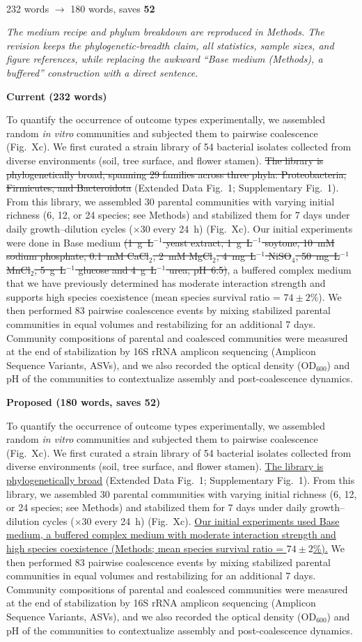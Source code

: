 \documentclass[11pt,a4paper]{article}
\newcommand{\figref}[1]{Fig.~X}
\newcommand{\cutx}[1]{{\color{CutRed}\sout{#1}}}
\newcommand{\newx}[1]{{\color{CutRed}\uline{#1}}}
\newcommand{\itemhead}[5]{\vspace{1.1em}\noindent{\color{HeadBlue}\large\textbf{#1}\quad\normalsize\textbf{#2}}\\[0.2em]
{\color{GrayNote}\small #3 words $\rightarrow$ #4 words, saves \textbf{#5}}\par}
\newcommand{\rationale}[1]{{\color{GrayNote}\small\textit{#1}}\par\smallskip}
\newcommand{\panel}[1]{\par\smallskip\noindent\textbf{\small #1}\par}
\begin{document}
\itemhead{R-2}{Results section 1, paragraph 2 (experimental setup)}{232}{180}{52}

\rationale{The medium recipe and phylum breakdown are reproduced in Methods. The revision keeps the phylogenetic-breadth claim, all statistics, sample sizes, and figure references, while replacing the awkward ``Base medium (Methods), a buffered'' construction with a direct sentence.}
\panel{Current (232 words)}
To quantify the occurrence of outcome types experimentally, we assembled random \textit{in vitro} communities and subjected them to pairwise coalescence (\figref{fig:fig1}c). We first curated a strain library of 54 bacterial isolates collected from diverse environments (soil, tree surface, and flower stamen). \cutx{The library is phylogenetically broad, spanning 29 families across three phyla: Proteobacteria, Firmicutes, and Bacteroidota }(Extended Data Fig.~1; Supplementary Fig.~1). From this library, we assembled 30 parental communities with varying initial richness (6, 12, or 24 species; see Methods) and stabilized them for 7 days under daily growth--dilution cycles ($\times$30 every 24~h) (\figref{fig:fig1}c). Our initial experiments were done in Base medium \cutx{(1~g~L$^{-1}$ yeast extract, 1~g~L$^{-1}$ soytone, 10~mM sodium phosphate, 0.1~mM CaCl$_2$, 2~mM MgCl$_2$, 4~mg~L$^{-1}$ NiSO$_4$, 50~mg~L$^{-1}$ MnCl$_2$, 5~g~L$^{-1}$ glucose and 4~g~L$^{-1}$ urea; pH~6.5)}, a buffered complex medium that we have previously determined has moderate interaction strength and supports high species coexistence (mean species survival ratio = $74 \pm 2$\%). We then performed 83 pairwise coalescence events by mixing stabilized parental communities in equal volumes and restabilizing for an additional 7 days. Community compositions of parental and coalesced communities were measured at the end of stabilization by 16S rRNA amplicon sequencing (Amplicon Sequence Variants, ASVs), and we also recorded the optical density (OD$_{600}$) and pH of the communities to contextualize assembly and post-coalescence dynamics.
\panel{Proposed (180 words, saves 52)}
To quantify the occurrence of outcome types experimentally, we assembled random \textit{in vitro} communities and subjected them to pairwise coalescence (\figref{fig:fig1}c). We first curated a strain library of 54 bacterial isolates collected from diverse environments (soil, tree surface, and flower stamen). \newx{The library is phylogenetically broad} (Extended Data Fig.~1; Supplementary Fig.~1). From this library, we assembled 30 parental communities with varying initial richness (6, 12, or 24 species; see Methods) and stabilized them for 7 days under daily growth--dilution cycles ($\times$30 every 24~h) (\figref{fig:fig1}c). \newx{Our initial experiments used Base medium, a buffered complex medium with moderate interaction strength and high species coexistence (Methods; mean species survival ratio = $74 \pm 2$\%).} We then performed 83 pairwise coalescence events by mixing stabilized parental communities in equal volumes and restabilizing for an additional 7 days. Community compositions of parental and coalesced communities were measured at the end of stabilization by 16S rRNA amplicon sequencing (Amplicon Sequence Variants, ASVs), and we also recorded the optical density (OD$_{600}$) and pH of the communities to contextualize assembly and post-coalescence dynamics.
\end{document}
